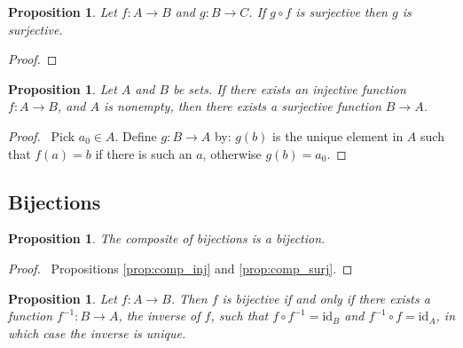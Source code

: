 \documentclass{book}
\let\qed\relax
\newtheorem{prop}[ax]{Proposition}
\theoremstyle{definition}
\newcommand{\id}[1]{\ensuremath{\mathrm{id}_{#1}}}
\newcommand{\inv}[1]{\ensuremath{{#1}^{-1}}}
\begin{document}
\begin{prop}
Let $f : A \rightarrow B$ and $g : B \rightarrow C$. If $g \circ f$ is surjective then $g$ is surjective.
\end{prop}

\begin{proof}
\pf
{}
\qed
\end{proof}

\begin{prop}
Let $A$ and $B$ be sets. If there exists an injective function $f : A \rightarrow B$, and $A$ is nonempty, then there exists a surjective function $B \rightarrow A$.
\end{prop}

\begin{proof}
\pf\ Pick $a_0 \in A$. Define $g : B \rightarrow A$ by: $g(b)$ is the unique element in $A$ such that $f(a) = b$ if there is such an $a$, otherwise $g(b) = a_0$. \qed
\end{proof}

\subsection{Bijections}

\begin{prop}
The composite of bijections is a bijection.
\end{prop}

\begin{proof}
\pf\ Propositions \ref{prop:comp_inj} and \ref{prop:comp_surj}. \qed
\end{proof}

\begin{prop}
Let $f : A \rightarrow B$. Then $f$ is bijective if and only if there exists a function $\inv{f} : B \rightarrow A$, the \emph{inverse} of $f$, such that $f \circ \inv{f} = \id{B}$ and $\inv{f} \circ f = \id{A}$, in which case the inverse is unique.
\end{prop}
\end{document}

